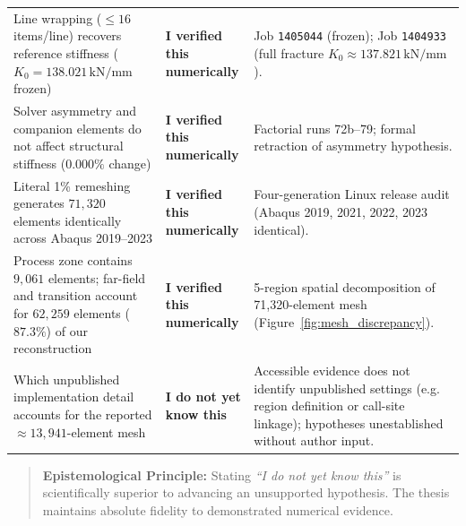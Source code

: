 \begin{table}[htbp]
\begin{tabularx}{\textwidth}{L{52mm} L{42mm} L{48mm}}
    \addlinespace
    Line wrapping ($\le 16$ items/line) recovers reference stiffness ($K_0=138.021\,\mathrm{kN/mm}$ frozen) & \textbf{I verified this numerically} & Job \texttt{1405044} (frozen); Job \texttt{1404933} (full fracture $K_0 \approx 137.821\,\mathrm{kN/mm}$). \\
    \addlinespace
    Solver asymmetry and companion elements do not affect structural stiffness ($0.000\%$ change) & \textbf{I verified this numerically} & Factorial runs 72b--79; formal retraction of asymmetry hypothesis. \\
    \addlinespace
    Literal 1\% remeshing generates $71{,}320$ elements identically across Abaqus 2019--2023 & \textbf{I verified this numerically} & Four-generation Linux release audit (Abaqus 2019, 2021, 2022, 2023 identical). \\
    \addlinespace
    Process zone contains $9{,}061$ elements; far-field and transition account for $62{,}259$ elements ($87.3\%$) of our reconstruction & \textbf{I verified this numerically} & 5-region spatial decomposition of 71,320-element mesh (Figure~\ref{fig:mesh_discrepancy}). \\
    \addlinespace
    Which unpublished implementation detail accounts for the reported $\approx 13{,}941$-element mesh & \textbf{I do not yet know this} & Accessible evidence does not identify unpublished settings (e.g. region definition or call-site linkage); hypotheses unestablished without author input. \\
    \bottomrule
  \end{tabularx}
\end{table}

\begin{quote}
\textbf{Epistemological Principle:} Stating \emph{``I do not yet know this''} is scientifically superior to advancing an unsupported hypothesis. The thesis maintains absolute fidelity to demonstrated numerical evidence.
\end{quote}
